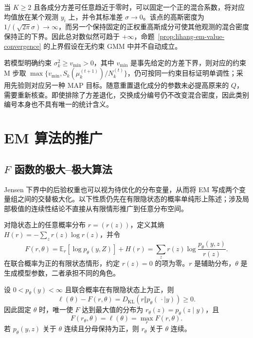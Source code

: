 \begin{notealert}[type=caution,title={高斯混合模型的似然可能无上界}]
当 $K\geq2$ 且各成分方差可任意趋近于零时，可以固定一个正的混合系数，将对应均值放在某个观测 $y_i$ 上，并令其标准差 $\sigma\to0$。该点的高斯密度为 $1/(\sqrt{2\pi}\sigma)\to\infty$，而另一个保持固定的正权重高斯成分可使其他观测的混合密度保持正的下界。因此总对数似然可趋于 $+\infty$，命题~\ref{prop:lihang-em-value-convergence} 的上界假设在无约束 GMM 中并不自动成立。

若模型明确约束 $\sigma_k^2\geq v_{\min}>0$，其中 $v_{\min}$ 是事先给定的方差下界，则对应的约束 M 步取 $\max\{v_{\min},S_k(\mu_k^{(t+1)})/N_k^{(t)}\}$，仍可按同一约束目标证明单调性；采用先验则对应另一种 MAP 目标。随意重置退化成分的参数未必提高原来的 $Q$，需要重新核查。即使排除了方差退化，交换成分编号仍不改变混合密度，因此类别编号本身也不具有唯一的统计含义。
\end{notealert}

\section{EM 算法的推广}
\label{sec:lihang-em-generalizations}

\subsection{$F$ 函数的极大--极大算法}
\label{subsec:lihang-em-f-function}

Jensen 下界中的后验权重也可以视为待优化的分布变量，从而将 EM 写成两个变量组之间的交替极大化。以下性质仍先在有限隐状态的概率单纯形上陈述；涉及局部极值的连续性结论不直接从有限情形推广到任意分布空间。

\begin{definition}[$F$ 函数]
\label{def:lihang-em-f-function}
对隐状态上的任意概率分布 $r=(r(z))$，定义其熵 $H(r)=-\sum_zr(z)\log r(z)$，并令
\begin{equation}
  F(r,\theta)=\mathbb E_r[\log p_\theta(y,Z)]+H(r)
  =\sum_zr(z)\log\frac{p_\theta(y,z)}{r(z)}.
  \label{eq:lihang-em-f-definition}
\end{equation}
在联合概率为正的有限状态情形，约定 $r(z)=0$ 的项为零。$r$ 是辅助分布，$\theta$ 是生成模型参数，二者承担不同的角色。
\end{definition}

\begin{lemma}[$F$ 的最大值与取等条件]
\label{lem:lihang-em-f-gap}
设 $0<p_\theta(y)<\infty$ 且联合概率在有限隐状态上为正，则
\begin{equation}
  \ell(\theta)-F(r,\theta)
  =D_{\mathrm{KL}}\!\left(r\Vert p_\theta(\,\cdot\mid y)\right)\geq0.
  \label{eq:lihang-em-f-gap}
\end{equation}
因此固定 $\theta$ 时，唯一使 $F$ 达到最大值的分布为 $r_\theta(z)=p_\theta(z\mid y)$，且
\begin{equation}
  F(r_\theta,\theta)=\ell(\theta)=\max_rF(r,\theta).
  \label{eq:lihang-em-f-profile}
\end{equation}
若 $p_\theta(y,z)$ 关于 $\theta$ 连续且分母保持为正，则 $r_\theta$ 关于 $\theta$ 连续。
\end{lemma}

